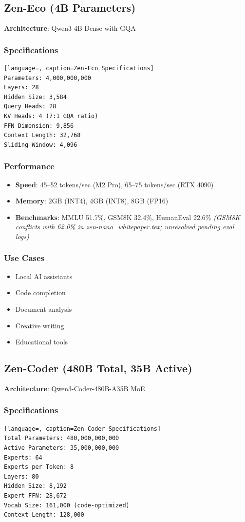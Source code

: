 \documentclass[11pt,a4paper]{article}
\begin{document}
\subsection{Zen-Eco (4B Parameters)}
\textbf{Architecture}: Qwen3-4B Dense with GQA

\subsubsection{Specifications}
\begin{lstlisting}[language=, caption=Zen-Eco Specifications]
Parameters: 4,000,000,000
Layers: 28
Hidden Size: 3,584
Query Heads: 28
KV Heads: 4 (7:1 GQA ratio)
FFN Dimension: 9,856
Context Length: 32,768
Sliding Window: 4,096
\end{lstlisting}

\subsubsection{Performance}
\begin{itemize}
    \item \textbf{Speed}: 45--52 tokens/sec (M2 Pro), 65--75 tokens/sec (RTX 4090)
    \item \textbf{Memory}: 2GB (INT4), 4GB (INT8), 8GB (FP16)
    \item \textbf{Benchmarks}: MMLU 51.7\%, GSM8K 32.4\%, HumanEval 22.6\% \textit{(GSM8K conflicts with 62.0\% in zen-nano\_whitepaper.tex; unresolved pending eval logs)}
\end{itemize}

\subsubsection{Use Cases}
\begin{itemize}
    \item Local AI assistants
    \item Code completion
    \item Document analysis
    \item Creative writing
    \item Educational tools
\end{itemize}

\subsection{Zen-Coder (480B Total, 35B Active)}
\textbf{Architecture}: Qwen3-Coder-480B-A35B MoE

\subsubsection{Specifications}
\begin{lstlisting}[language=, caption=Zen-Coder Specifications]
Total Parameters: 480,000,000,000
Active Parameters: 35,000,000,000
Experts: 64
Experts per Token: 8
Layers: 80
Hidden Size: 8,192
Expert FFN: 28,672
Vocab Size: 161,000 (code-optimized)
Context Length: 128,000
\end{lstlisting}
\end{document}

